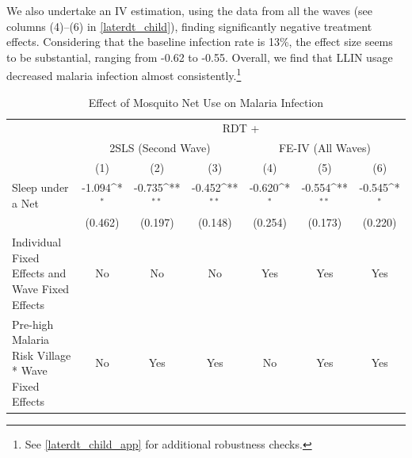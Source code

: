 \documentclass[fleqn,11pt]{article}
\newcommand{\sym}[1]{\rlap{$#1$}}
\def\sym#1{\ifmmode^{#1}\else\(^{#1}\)\fi
}
\begin{document}
We also undertake an IV estimation, using the data from all the waves (see columns (4)--(6) in \autoref{laterdt_child}), finding significantly negative treatment effects. Considering that the baseline infection rate is 13\%, the effect size seems to be substantial, ranging from -0.62 to -0.55. Overall, we find that LLIN usage decreased malaria infection almost consistently.\footnote{See \autoref{laterdt_child_app} for additional robustness checks.}



\begin{table}[h]
\caption{Effect of Mosquito Net Use on Malaria Infection}
\label{laterdt_child}\centering
\begin{adjustbox}{max width=\textwidth}
\begin{threeparttable}
\begin{tabular}{l*{6}{c}}
\hline\hline
&\multicolumn{6}{c}{RDT +}\\     \cmidrule(lr){2-7}
                                        &\multicolumn{3}{c}{2SLS (Second Wave)}&\multicolumn{3}{c}{FE-IV (All Waves)}\\  \cmidrule(lr){2-4}  \cmidrule(lr){5-7}

                    &\multicolumn{1}{c}{(1)}&\multicolumn{1}{c}{(2)}&\multicolumn{1}{c}{(3)}&\multicolumn{1}{c}{(4)}&\multicolumn{1}{c}{(5)}&\multicolumn{1}{c}{(6)}\\

\hline
Sleep under a Net      &      -1.094\sym{*}  &      -0.735\sym{**} &      -0.452\sym{**} &      -0.620\sym{*}  &      -0.554\sym{**} &      -0.545\sym{*}  \\
                    &     (0.462)         &     (0.197)         &     (0.148)         &     (0.254)         &     (0.173)         &     (0.220)         \\

Individual Fixed Effects and Wave Fixed Effects &          No         &          No         &          No         &         Yes         &         Yes         &         Yes         \\

Pre-high Malaria Risk Village * Wave Fixed Effects&          No         &         Yes         &         Yes         &          No         &         Yes         &         Yes         \\


\end{tabular}
\end{threeparttable}
\end{adjustbox}
\end{table}
\end{document}
